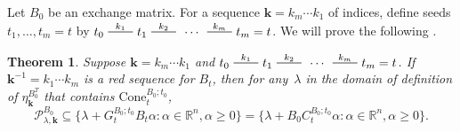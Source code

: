 \documentclass{amsart}
\newtheorem{theorem}[proposition]{Theorem}
\theoremstyle{definition}
\theoremstyle{remark}
\numberwithin{equation}{section}
\newcommand{\reals}{\mathbb R}
\newcommand{\edge}{\,\,\rule[2.7pt]{20pt}{0.5pt}\,\,}
\newcommand{\set}[1]{{\lbrace #1 \rbrace}}
\newcommand{\0}{{\mathbf{0}}}
\newcommand{\Cone}{\mathrm{Cone}}
\newcommand{\kk}{\mathbf{k}}
\renewcommand{\P}{\mathcal{P}}
\begin{document}
Let $B_0$ be an exchange matrix.
For a sequence $\kk=k_m\cdots k_1$ of indices, define seeds $t_1,\ldots,t_m=t$ by $t_0\overset{k_1}{\edge}t_1\overset{k_2}{\edge}\,\cdots\,\overset{k_m}{\edge}t_m=t$.
We will prove the following .
%
%
%
%
%
%
%
%
%
%

\begin{theorem}\label{P in B0C}
Suppose $\kk=k_m\cdots k_1$ and $t_0\overset{k_1}{\edge}t_1\overset{k_2}{\edge}\,\cdots\,\overset{k_m}{\edge}t_m=t$.
If $\kk^{-1}=k_1\cdots k_m$ is a red sequence for $B_t$, then for any~$\lambda$ in the domain of definition of $\eta_\kk^{B_0^T}$ that contains $\Cone^{B_0;t_0}_t$,
\[\P^{B_0}_{\lambda,\kk}\subseteq\set{\lambda+G_t^{B_0;t_0}B_t\alpha:\alpha\in\reals^n,\alpha\ge0}=\set{\lambda+B_0C_t^{B_0;t_0}\alpha:\alpha\in\reals^n,\alpha\ge0}.\]
\end{theorem}
\end{document}
